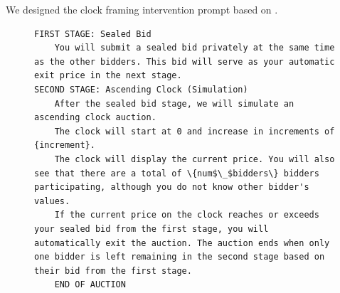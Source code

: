 We designed the clock framing intervention prompt based on \citet{breitmoser2022obviousness}.
\begin{figure}[H]
\centering
\begin{minipage}{0.95\textwidth}
\begin{lstlisting}
FIRST STAGE: Sealed Bid
    You will submit a sealed bid privately at the same time as the other bidders. This bid will serve as your automatic exit price in the next stage.  
SECOND STAGE: Ascending Clock (Simulation) 
    After the sealed bid stage, we will simulate an ascending clock auction.
    The clock will start at 0 and increase in increments of {increment}.
    The clock will display the current price. You will also see that there are a total of \{num$\_$bidders\} bidders participating, although you do not know other bidder's values.
    If the current price on the clock reaches or exceeds your sealed bid from the first stage, you will automatically exit the auction. The auction ends when only one bidder is left remaining in the second stage based on their bid from the first stage. 
    END OF AUCTION
\end{lstlisting}
\end{minipage}
\label{fig:sealbid_prompt}
\end{figure}








